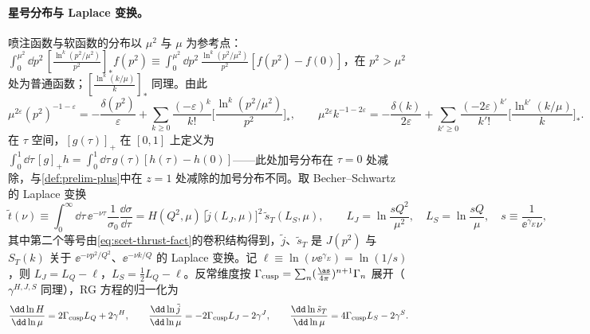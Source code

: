 \paragraph{星号分布与 Laplace 变换。}
喷注函数与软函数的分布以 $\mu^2$ 与 $\mu$ 为参考点：
$\int_0^{\mu^2}\dd p^2\,[\frac{\ln^k(p^2/\mu^2)}{p^2}]_*f(p^2)\equiv\int_0^{\mu^2}\dd p^2\,\frac{\ln^k(p^2/\mu^2)}{p^2}[f(p^2)-f(0)]$，在 $p^2>\mu^2$ 处为普通函数；$[\frac{\ln^k(k/\mu)}{k}]_*$ 同理。由此
\begin{equation}\label{eq:scet-distid}
\mu^{2\varepsilon}(p^2)^{-1-\varepsilon}=-\frac{\delta(p^2)}{\varepsilon}+\sum_{k\ge0}\frac{(-\varepsilon)^k}{k!}\Big[\frac{\ln^k(p^2/\mu^2)}{p^2}\Big]_*,\qquad
\mu^{2\varepsilon}k^{-1-2\varepsilon}=-\frac{\delta(k)}{2\varepsilon}+\sum_{k'\ge0}\frac{(-2\varepsilon)^{k'}}{k'!}\Big[\frac{\ln^{k'}(k/\mu)}{k}\Big]_* .
\end{equation}
在 $\tau$ 空间，$[g(\tau)]_+$ 在 $[0,1]$ 上定义为 $\int_0^1\dd\tau\,[g]_+h=\int_0^1\dd\tau\,g(\tau)[h(\tau)-h(0)]$——此处加号分布在 $\tau=0$ 处减除，与\cref{def:prelim-plus}中在 $z=1$ 处减除的加号分布不同。取 Becher--Schwartz 的 Laplace 变换\cite[附录~B]{BecherSchwartz2008}
\begin{equation}\label{eq:scet-laplace}
\tilde t(\nu)\equiv\int_0^\infty\dd\tau\,\ee^{-\nu\tau}\frac{1}{\sigma_0}\frac{\dd\sigma}{\dd\tau}=H(Q^2,\mu)\,\big[\tilde j(L_J,\mu)\big]^2\,\tilde s_T(L_S,\mu),\qquad
L_J=\ln\frac{sQ^2}{\mu^2},\quad L_S=\ln\frac{sQ}{\mu},\quad s\equiv\frac{1}{\ee^{\gamma_E}\nu},
\end{equation}
其中第二个等号由\cref{eq:scet-thrust-fact}的卷积结构得到，$\tilde j$、$\tilde s_T$ 是 $J(p^2)$ 与 $S_T(k)$ 关于 $\ee^{-\nu p^2/Q^2}$、$\ee^{-\nu k/Q}$ 的 Laplace 变换。记 $\ell\equiv\ln(\nu\ee^{\gamma_E})=\ln(1/s)$，则 $L_J=L_Q-\ell$，$L_S=\frac12L_Q-\ell$。反常维度按 $\Gamma_{\rm cusp}=\sum_n(\frac{\as}{4\pi})^{n+1}\Gamma_n$ 展开（$\gamma^{H,J,S}$ 同理），RG 方程的归一化为
\begin{equation}\label{eq:scet-RGE}
\frac{\dd\ln H}{\dd\ln\mu}=2\Gamma_{\rm cusp}L_Q+2\gamma^H,\qquad
\frac{\dd\ln\tilde j}{\dd\ln\mu}=-2\Gamma_{\rm cusp}L_J-2\gamma^J,\qquad
\frac{\dd\ln\tilde s_T}{\dd\ln\mu}=4\Gamma_{\rm cusp}L_S-2\gamma^S .
\end{equation}


